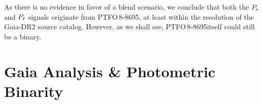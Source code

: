 \documentclass[12pt,twocolumn,tighten]{aastex62}
\newcommand{\ptfo}{PTFO$\,$8-8695}
\begin{document}
As there is no evidence in favor of a blend scenario, we conclude that
both the $P_{\rm s}$ and $P_{\rm \ell}$ signals originate from \ptfo,
at least within the resolution of the Gaia-DR2 source catalog.
However, as we shall see, \ptfo itself could still be a binary.


\section{Gaia Analysis \& Photometric Binarity}
\label{sec:gaia}

\end{document}

